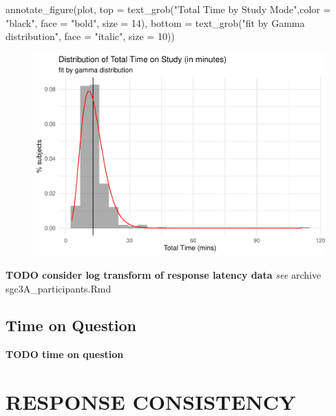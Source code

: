 \documentclass[
  letterpaper,
  DIV=11,
  numbers=noendperiod]{scrreprt}
\newenvironment{Shaded}{\begin{snugshade}}{\end{snugshade}}
\newcommand{\AttributeTok}[1]{\textcolor[rgb]{0.40,0.45,0.13}{#1}}
\newcommand{\DecValTok}[1]{\textcolor[rgb]{0.68,0.00,0.00}{#1}}
\newcommand{\FunctionTok}[1]{\textcolor[rgb]{0.28,0.35,0.67}{#1}}
\newcommand{\NormalTok}[1]{\textcolor[rgb]{0.00,0.23,0.31}{#1}}
\newcommand{\StringTok}[1]{\textcolor[rgb]{0.13,0.47,0.30}{#1}}
\begin{document}
\begin{Shaded}
\begin{Highlighting}[]
\FunctionTok{annotate\_figure}\NormalTok{(plot, }
                \AttributeTok{top =} \FunctionTok{text\_grob}\NormalTok{(}\StringTok{"Total Time by Study Mode"}\NormalTok{,}\AttributeTok{color =} \StringTok{"black"}\NormalTok{, }\AttributeTok{face =} \StringTok{"bold"}\NormalTok{, }\AttributeTok{size =} \DecValTok{14}\NormalTok{),}
                \AttributeTok{bottom =} \FunctionTok{text\_grob}\NormalTok{(}\StringTok{"fit by Gamma distribution"}\NormalTok{, }\AttributeTok{face =} \StringTok{"italic"}\NormalTok{, }\AttributeTok{size =} \DecValTok{10}\NormalTok{))}
\end{Highlighting}
\end{Shaded}

\begin{figure}[H]

{\centering \includegraphics{analysis/SGC3A/3_sgc3A_description_files/figure-pdf/label - VIS-TOTALTIMEmessage - falsewarning - false-1.pdf}

}

\end{figure}

\textbf{TODO consider log transform of response latency data} \emph{see}
archive sgc3A\_participants.Rmd

\hypertarget{time-on-question}{%
\subsection{Time on Question}\label{time-on-question}}

\textbf{TODO time on question}

\hypertarget{response-consistency}{%
\section{RESPONSE CONSISTENCY}\label{response-consistency}}
\end{document}
